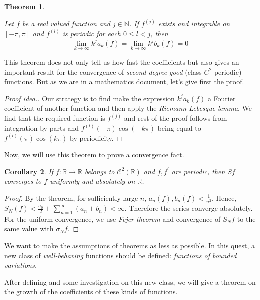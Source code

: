 \documentclass[12pt]{amsart}
\newtheorem{theorem}{Theorem}[section]
\newtheorem{corollary}[theorem]{Corollary}
\theoremstyle{definition}
\newcommand{\RR}{{\mathbb R}} %
\newcommand{\cC}{{\mathcal C}}
\begin{document}
\begin{theorem}\label{growth of coefficients in C^j}

    Let $f$ be a real valued function and $j \in \mathbb{N}$. If $f^{(j)}$ exists and integrable on $[-\pi,\pi]$ and $f^{(l)}$ is periodic for each $0 \leq l < j$, then
    \begin{equation}
        \lim_{k \to \infty} k^j a_k(f) = \lim_{k \to \infty} k^j b_k(f) = 0
    \end{equation}
\end{theorem}


This theorem does not only tell us how fast the coefficients but also gives an important result for the convergence of \textit{second degree good} (class $C^2$-periodic) functions. But as we are in a mathematics document, let's give first the proof.


\begin{proof}[Proof idea.]
    Our strategy is to find make the expression $k^ja_k(f)$ a Fourier coefficient of another function and then apply the \emph{Riemann-Lebesque lemma}. We find that the required function is $f^{(j)}$ and rest of the proof follows from integration by parts and $f^{(l)}(-\pi)\cos(-k\pi)$ being equal to $f^{(l)}(\pi)\cos(k\pi)$ by periodicity.
\end{proof}


Now, we will use this theorem to prove a convergence fact.


\begin{corollary}\label{C^2 converges}
    If $f: \RR \to \RR$ belongs to $\cC^2(\RR) $ and $f, f^{'}$ are periodic, then $Sf$ converges to $f$ uniformly and absolutely on $\RR$.
\end{corollary}


\begin{proof}
    By the theorem, for sufficiently large $n$, $a_n(f), b_n(f) < \frac{1}{n^2}$. Hence, $S_N(f) <  \frac{a_0}{2} + \sum_{n=1}^{\infty} \left(a_n + b_n\right) < \infty$. Therefore the series converge absolutely. For the uniform convergence, we use \textit{Fejer theorem} and convergence of $S_Nf$ to the same value with $\sigma_N f$.
\end{proof}


We want to make the assumptions of theorems as less as possible. In this quest, a new class of \emph{well-behaving} functions should be defined: \emph{functions of bounded variations.} 


After defining and some investigation on this new class, we will give a theorem on the growth of the coefficients of these kinds of functions.
\end{document}
